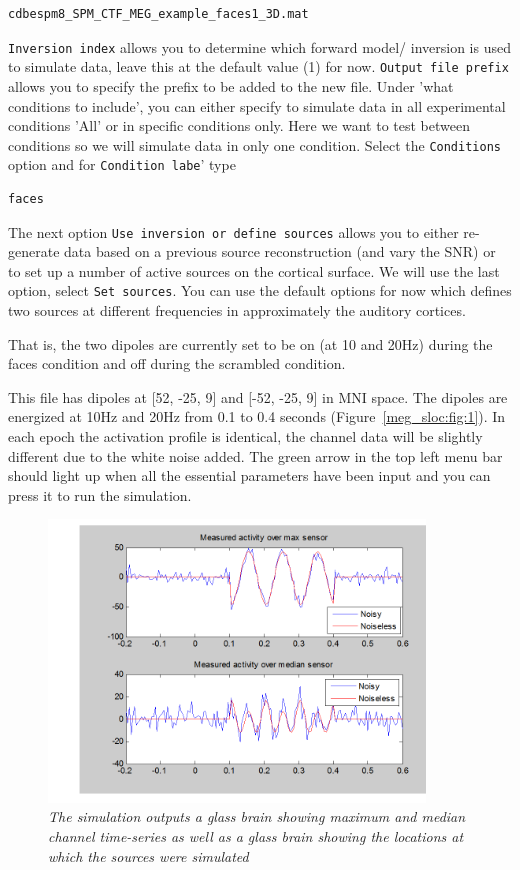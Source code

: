 \begin{verbatim}
cdbespm8_SPM_CTF_MEG_example_faces1_3D.mat
\end{verbatim}

\texttt{Inversion index} allows you to determine which forward model/ inversion is used to simulate data, leave this at the default value (1) for now.
\texttt{Output file prefix} allows you to specify the prefix to be added to the new file.
Under 'what conditions to include',  you can either specify to simulate data in all experimental conditions 'All' or in specific conditions only. Here we want to test between conditions so we will simulate data  in only one condition. Select the \texttt{Conditions} option and for \texttt{Condition labe}'  type 
\begin{verbatim}
faces
\end{verbatim}

The next option \texttt{Use inversion or define sources} allows you to either re-generate data based on a previous source reconstruction (and vary the SNR) or to set up a number of active sources on the cortical surface. We will use the last option, select \texttt{Set sources}. You can use the default options for now which defines two sources at different frequencies in approximately the auditory cortices.

That is, the two dipoles are currently set to be on (at 10 and 20Hz) during the faces condition and off during the scrambled condition.

This file has dipoles at [52, -25, 9] and  [-52, -25, 9] in MNI space. The dipoles are energized at 10Hz and 20Hz from 0.1 to 0.4 seconds (Figure~\ref{meg_sloc:fig:1}). In each epoch the activation profile is identical, the channel data will be slightly different due to the white noise added. The green arrow in the top left menu bar should light up when all the essential parameters have been input and you can press it to run the simulation.

\begin{figure}
\begin{center}
\includegraphics[width=100mm]{meg_sloc/slide2}
\caption{\em The simulation outputs a glass brain showing maximum and median channel time-series as well as a glass brain showing the locations at which the sources were simulated } \label{meg_sloc:fig:2}
\end{center}
\end{figure}

